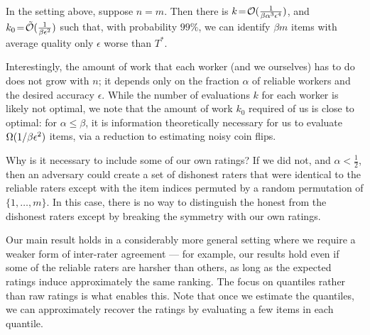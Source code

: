 \begin{theorem}
\label{thm:intro}
In the setting above, suppose $n \!=\! m$. Then there is  
$k \!=\! \mathcal{O}(\tfrac{1}{\beta\alpha^3\epsilon^4})$, and 
$k_0 \!=\! \tilde{\mathcal{O}}(\tfrac{1}{\beta\epsilon^2})$ such that, with probability 
$99\%$, we can identify $\beta m$ items with average quality only
$\epsilon$ worse than $T^*$.
\end{theorem}
Interestingly, the amount of work that each worker (and we ourselves) has 
to do does not grow with $n$; it depends only on the fraction $\alpha$ of 
reliable workers and the desired accuracy $\epsilon$. While the number 
of evaluations $k$ for each worker is likely not optimal, we note that 
the amount of work $k_0$ required of us is close to optimal: 
for $\alpha \le \beta$, it is information theoretically necessary for 
us to evaluate $\Omega(1/\beta\epsilon^2)$ items, via a reduction to estimating 
noisy coin flips. %

Why is it necessary to include some of our own ratings? 
If we did not, and $\alpha < \frac{1}{2}$, then an adversary could create a set of 
dishonest raters that were identical to the reliable raters except with the 
item indices permuted by a random permutation of $\{1,\ldots,m\}$. In this case, 
there is no way to distinguish the honest from the dishonest raters except by 
breaking the symmetry with our own ratings.

Our main result holds in a considerably more general setting where we require a 
weaker form of inter-rater agreement --- for example, our results hold even if 
some of the reliable raters are harsher than others, as long as 
the expected ratings induce approximately the same ranking.
The focus on quantiles rather than raw ratings is what enables this. 
Note that once we estimate the quantiles, we can approximately recover the 
ratings by evaluating a few items in each quantile.


